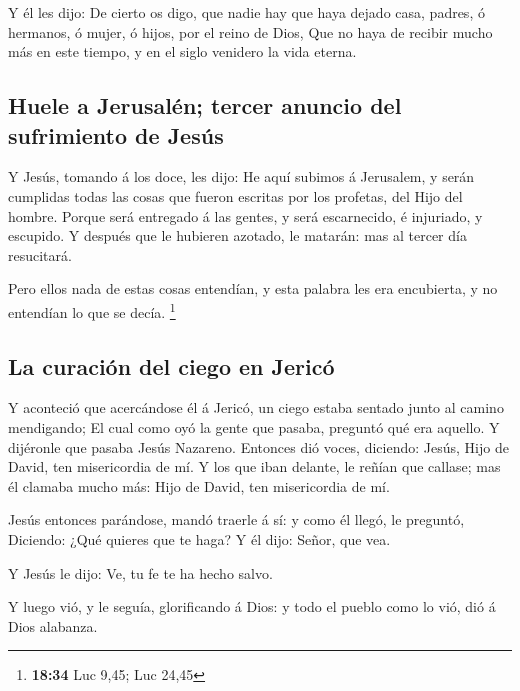  Y él les dijo: De cierto os digo, que nadie hay que haya
dejado casa, padres, ó hermanos, ó mujer, ó hijos, por el reino de Dios,
 Que no haya de recibir mucho más en este tiempo, y en el
siglo venidero la vida eterna.

\hypertarget{huele-a-jerusaluxe9n-tercer-anuncio-del-sufrimiento-de-jesuxfas}{%
\subsection{Huele a Jerusalén; tercer anuncio del sufrimiento de
Jesús}\label{huele-a-jerusaluxe9n-tercer-anuncio-del-sufrimiento-de-jesuxfas}}

 Y Jesús, tomando á los doce, les dijo: He aquí subimos á
Jerusalem, y serán cumplidas todas las cosas que fueron escritas por los
profetas, del Hijo del hombre.  Porque será entregado á
las gentes, y será escarnecido, é injuriado, y escupido. 
Y después que le hubieren azotado, le matarán: mas al tercer día
resucitará.

 Pero ellos nada de estas cosas entendían, y esta palabra
les era encubierta, y no entendían lo que se decía. \footnote{\textbf{18:34}
  Luc 9,45; Luc 24,45}

\hypertarget{la-curaciuxf3n-del-ciego-en-jericuxf3}{%
\subsection{La curación del ciego en
Jericó}\label{la-curaciuxf3n-del-ciego-en-jericuxf3}}

 Y aconteció que acercándose él á Jericó, un ciego estaba
sentado junto al camino mendigando;  El cual como oyó la
gente que pasaba, preguntó qué era aquello.  Y dijéronle
que pasaba Jesús Nazareno.  Entonces dió voces, diciendo:
Jesús, Hijo de David, ten misericordia de mí.  Y los que
iban delante, le reñían que callase; mas él clamaba mucho más: Hijo de
David, ten misericordia de mí.

 Jesús entonces parándose, mandó traerle á sí: y como él
llegó, le preguntó,  Diciendo: ¿Qué quieres que te haga?
Y él dijo: Señor, que vea.

 Y Jesús le dijo: Ve, tu fe te ha hecho salvo.

 Y luego vió, y le seguía, glorificando á Dios: y todo el
pueblo como lo vió, dió á Dios alabanza.


